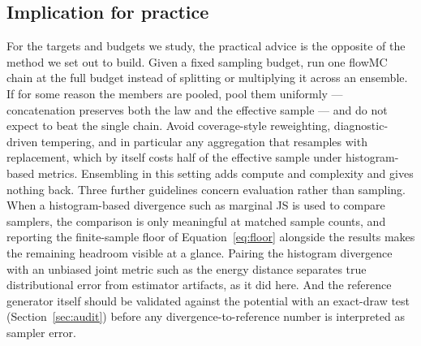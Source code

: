 \documentclass[11pt]{article}
\begin{document}
\subsection{Implication for practice}
For the targets and budgets we study, the practical advice is the opposite of
the method we set out to build. Given a fixed sampling budget, run one flowMC
chain at the full budget instead of splitting or multiplying it across an
ensemble. If for some reason the members are pooled, pool them uniformly ---
concatenation preserves both the law and the effective sample --- and do not
expect to beat the single chain. Avoid coverage-style reweighting,
diagnostic-driven tempering, and in particular any aggregation that resamples
with replacement, which by itself costs half of the effective sample under
histogram-based metrics. Ensembling in this setting adds compute and
complexity and gives nothing back. Three further guidelines concern evaluation
rather than sampling. When a histogram-based divergence such as marginal JS is
used to compare samplers, the comparison is only meaningful at matched sample
counts, and reporting the finite-sample floor of
Equation~\eqref{eq:floor} alongside the results makes the remaining headroom
visible at a glance. Pairing the histogram divergence with an unbiased joint
metric such as the energy distance separates true distributional error from
estimator artifacts, as it did here. And the reference generator itself should
be validated against the potential with an exact-draw test
(Section~\ref{sec:audit}) before any divergence-to-reference number is
interpreted as sampler error.
\end{document}
